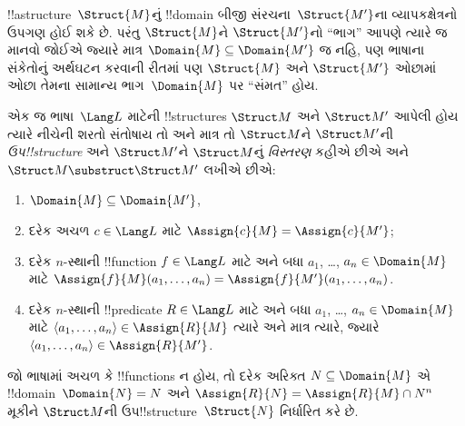\documentclass[../../../include/open-logic-section]{subfiles}
\begin{document}

!!a{structure}~$\Struct{M}$નું !!{domain} બીજી સંરચના~$\Struct{M'}$ના
વ્યાપકક્ષેત્રનો ઉપગણ હોઈ શકે છે. પરંતુ $\Struct{M}$ને $\Struct{M'}$નો
``ભાગ'' આપણે ત્યારે જ માનવો જોઈએ જ્યારે માત્ર $\Domain{M} \subseteq
\Domain{M'}$ જ નહિ, પણ ભાષાના સંકેતોનું અર્થઘટન કરવાની રીતમાં પણ
$\Struct{M}$ અને $\Struct{M'}$ ઓછામાં ઓછા તેમના સામાન્ય
ભાગ~$\Domain{M}$ પર ``સંમત'' હોય.

\begin{defn}
એક જ ભાષા~$\Lang L$ માટેની !!{structure}s $\Struct M$ અને
$\Struct M'$ આપેલી હોય ત્યારે નીચેની શરતો સંતોષાય તો અને માત્ર તો
$\Struct M$ને $\Struct M'$ની \emph{ઉપ!!{structure}} અને
$\Struct M'$ને $\Struct M$નું \emph{વિસ્તરણ} કહીએ છીએ અને
$\Struct M \substruct \Struct M'$ લખીએ છીએ:
\begin{enumerate}
\item $\Domain{M} \subseteq \Domain{M'}$,
\item દરેક અચળ $c \in \Lang L$ માટે $\Assign{c}{M} =
    \Assign{c}{M'}$;
\item દરેક $n$-સ્થાની !!{function} $f \in \Lang L$ માટે અને બધા
  $a_1$, \dots, $a_n \in \Domain{M}$ માટે
  $\Assign{f}{M}(a_1, \dots, a_n) = \Assign{f}{M'}(a_1, \dots, a_n)$.
\item દરેક $n$-સ્થાની !!{predicate} $R \in \Lang L$ માટે અને બધા
  $a_1$, \dots, $a_n \in \Domain{M}$ માટે $\langle
  a_1, \dots, a_n\rangle \in \Assign{R}{M}$ ત્યારે અને માત્ર ત્યારે,
  જ્યારે $\langle a_1, \dots, a_n\rangle \in \Assign{R}{M'}$.
\end{enumerate}
\end{defn}

\begin{rem}
જો ભાષામાં અચળ કે !!{function}s ન હોય, તો દરેક અરિક્ત
$N \subseteq \Domain{M}$ એ !!{domain}~$\Domain{N} = N$ અને
$\Assign{R}{N} = \Assign{R}{M} \cap N^n$ મૂકીને $\Struct M$ની
ઉપ!!{structure}~$\Struct{N}$ નિર્ધારિત કરે છે.
\end{rem}

\end{document}
